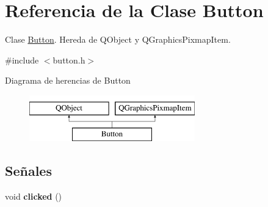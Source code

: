 \hypertarget{classButton}{\section{Referencia de la Clase Button}
\label{classButton}
}


Clase \hyperlink{classButton}{Button}. Hereda de Q\-Object y Q\-Graphics\-Pixmap\-Item.  




{\ttfamily \#include $<$button.\-h$>$}

Diagrama de herencias de Button\begin{figure}[H]
\begin{center}
\leavevmode
\includegraphics[height=2.000000cm]{classButton}
\end{center}
\end{figure}
\subsection*{Señales}
\begin{DoxyCompactItemize}
\item 
\hypertarget{classButton_a9e7ab4152cb1e7e3beb7f2842f32670c}{void {\bfseries clicked} ()}\label{classButton_a9e7ab4152cb1e7e3beb7f2842f32670c}

\end{DoxyCompactItemize}
